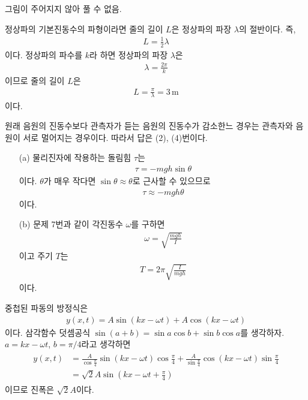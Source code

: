 \documentclass[floatfix,nofootinbib,superscriptaddress,fleqn]{revtex4-2}
\begin{document}
그림이 주어지지 않아 풀 수 없음.
\vspace{0.5cm}
 

\vspace{0.5cm} 
정상파의 기본진동수의 파형이라면 줄의 길이 $L$은 정상파의 파장 $\lambda$의 절반이다. 즉,
\begin{align}
  L = \frac{1}{2}\lambda
\end{align}
이다. 정상파의 파수를 $k$라 하면 정상파의 파장 $\lambda$은
\begin{align}
  \lambda = \frac{2\pi}{k}
\end{align}
이므로 줄의 길이 $L$은
\begin{align}
  L = \frac{\pi}{\lambda} = 3\,\mathrm{m}
\end{align}
이다.
 

\vspace{0.5cm} 
원래 음원의 진동수보다 관측자가 듣는 음원의 진동수가 감소한느 경우는 관측자와 음원이 서로 멀어지는
경우이다. 따라서 답은 (2), (4)번이다.
\vspace{0.5cm}
 
\begin{itemize}
  \item[(a)]
  물리진자에 작용하는 돌림힘 $\tau$는
  \begin{align}
    \tau = -mgh\sin\theta
  \end{align}
  이다. $\theta$가 매우 작다면 $\sin\theta\approx\theta$로 근사할 수 있으므로
  \begin{align}
    \tau \approx -mgh\theta
  \end{align}
  이다.
  \item[(b)] 
  문제 7번과 같이 각진동수 $\omega$를 구하면
  \begin{align}
    \omega = \sqrt{\frac{mgh}{I}}
  \end{align}
  이고 주기 $T$는
  \begin{align}
    T = 2\pi\sqrt{\frac{I}{mgh}}
  \end{align}
  이다.
\end{itemize}
\vspace{0.5cm}
 
중첩된 파동의 방정식은
\begin{align}
  y(x,t) = A\sin(kx-\omega t)+A\cos(kx-\omega t)
\end{align}
이다. 삼각함수 덧셈공식 $\sin(a+b) = \sin a\cos b+\sin b\cos a$를 생각하자.
$a = kx-\omega t$, $b= \pi/4$라고 생각하면
\begin{align}
  \begin{split}
    y(x,t) &= \frac{A}{\cos\frac{\pi}{4}}\sin(kx-\omega t)\cos\frac{\pi}{4}
    +\frac{A}{\sin\frac{\pi}{4}}\cos(kx-\omega t)\sin\frac{\pi}{4}  \\
    &=\sqrt{2}A\sin(kx-\omega t+\frac{\pi}{4})
  \end{split}
\end{align}
이므로 진폭은 $\sqrt{2}A$이다.
\end{document}
